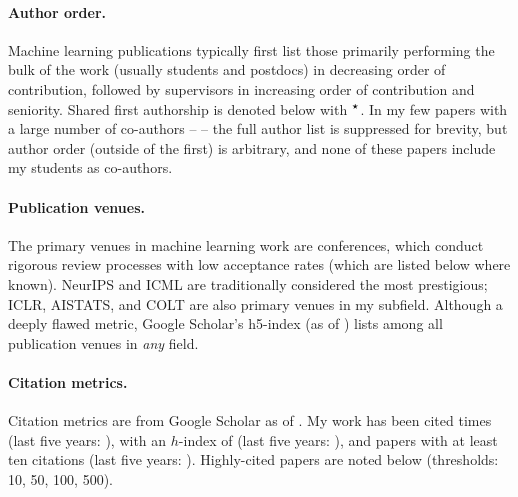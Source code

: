 \documentclass[10pt]{article}
\begin{document}
\paragraph{Author order.} Machine learning publications typically first list those primarily performing the bulk of the work (usually students and postdocs) in decreasing order of contribution,
followed by supervisors in increasing order of contribution and seniority.
Shared first authorship is denoted below with $^{\boldsymbol\star}$.
In my few papers with a large number of co-authors -- \lotsoauths{} -- the full author list is suppressed for brevity,
but author order (outside of the first) is arbitrary, and none of these papers include my students as co-authors.

\paragraph{Publication venues.} The primary venues in machine learning work are conferences,
which conduct rigorous review processes with low acceptance rates (which are listed below where known).
NeurIPS and ICML are traditionally considered the most prestigious;
ICLR, AISTATS, and COLT are also primary venues in my subfield.
Although a deeply flawed metric, Google Scholar's h5-index (as of \citeupdatedate{}) lists \hfiveinfo{} among all publication venues in \emph{any} field.

\paragraph{Citation metrics.}
Citation metrics are from Google Scholar as of \citeupdatedate{}.
My work has been cited \totalcites{} times (last five years: \totalcitesrec{}),
with an $h$-index of \hindex{} (last five years: \hindexrec{}),
and \itenindex{} papers with at least ten citations (last five years: \itenindexrec{}).
Highly-cited papers are noted below (thresholds: 10, 50, 100, 500).

\end{document}
